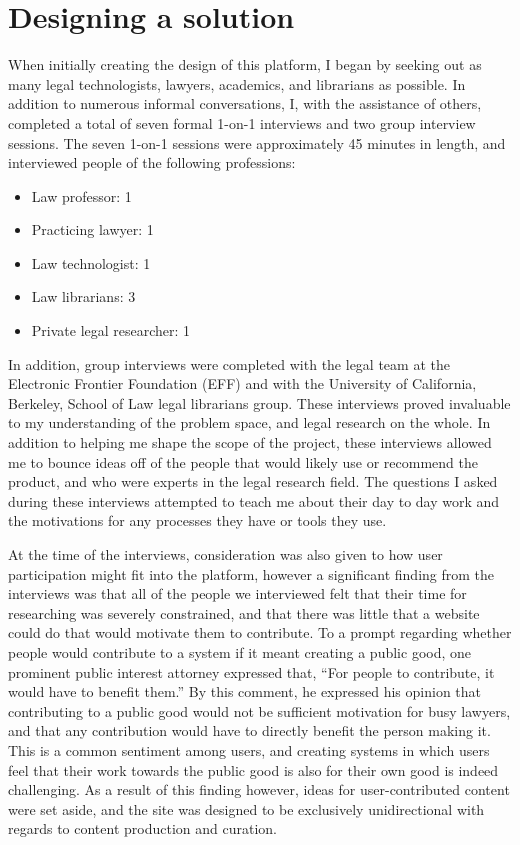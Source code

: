 \label{solutiondesign}
\section{Designing a solution}
When initially creating the design of this platform, I began by seeking out as many legal technologists, lawyers, academics, and librarians as possible. In addition to numerous informal conversations, I, with the assistance of others, completed a total of seven formal 1-on-1 interviews and two group interview sessions. The seven 1-on-1 sessions were approximately 45 minutes in length, and interviewed people of the following professions:
\begin{itemize}
\item Law professor: 1 
\item Practicing lawyer: 1
\item Law technologist: 1
\item Law librarians: 3
\item Private legal researcher: 1
\end{itemize}
In addition, group interviews were completed with the legal team at the Electronic Frontier Foundation (EFF) and with the University of California, Berkeley, School of Law legal librarians group. These interviews proved invaluable to my understanding of the problem space, and legal research on the whole. In addition to helping me shape the scope of the project, these interviews allowed me to bounce ideas off of the people that would likely use or recommend the product, and who were experts in the legal research field. The questions I asked during these interviews attempted to teach me about their day to day work and the motivations for any processes they have or tools they use. 

At the time of the interviews, consideration was also given to how user participation might fit into the platform, however a significant finding from the interviews was that all of the people we interviewed felt that their time for researching was severely constrained, and that there was little that a website could do that would motivate them to contribute. To a prompt regarding whether people would contribute to a system if it meant creating a public good, one prominent public interest attorney expressed that, ``For people to contribute, it would have to benefit them.'' By this comment, he expressed his opinion that contributing to a public good would not be sufficient motivation for busy lawyers, and that any contribution would have to directly benefit the person making it. This is a common sentiment among users, and creating systems in which users feel that their work towards the public good is also for their own good is indeed challenging. As a result of this finding however, ideas for user-contributed content were set aside, and the site was designed to be exclusively unidirectional with regards to content production and curation.

